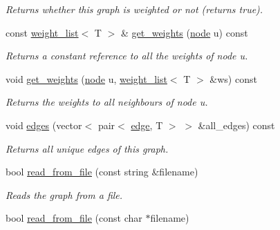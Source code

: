\begin{DoxyCompactItemize}
\begin{DoxyCompactList}\small\item\em Returns whether this graph is weighted or not (returns true). \end{DoxyCompactList}\item 
const \hyperlink{namespacelgraph_1_1utils_a11e7963f3637ea13778b8d3e69d2c17f}{weight\+\_\+list}$<$ T $>$ \& \hyperlink{classlgraph_1_1utils_1_1wxgraph_a06252e99191d39329947c3a5eef43e73}{get\+\_\+weights} (\hyperlink{namespacelgraph_1_1utils_a7bd66ede3805ef121bc2835bd48de0cf}{node} u) const 
\begin{DoxyCompactList}\small\item\em Returns a constant reference to all the weights of node {\itshape u}. \end{DoxyCompactList}\item 
void \hyperlink{classlgraph_1_1utils_1_1wxgraph_a23c629eb031e31681749da793f933548}{get\+\_\+weights} (\hyperlink{namespacelgraph_1_1utils_a7bd66ede3805ef121bc2835bd48de0cf}{node} u, \hyperlink{namespacelgraph_1_1utils_a11e7963f3637ea13778b8d3e69d2c17f}{weight\+\_\+list}$<$ T $>$ \&ws) const 
\begin{DoxyCompactList}\small\item\em Returns the weights to all neighbours of node {\itshape u}. \end{DoxyCompactList}\item 
void \hyperlink{classlgraph_1_1utils_1_1wxgraph_a73b6c8887d5088750ee2cc98c45089c6}{edges} (vector$<$ pair$<$ \hyperlink{namespacelgraph_1_1utils_a6510284ce1b1ae5dc97ce5d2de426e10}{edge}, T $>$ $>$ \&all\+\_\+edges) const 
\begin{DoxyCompactList}\small\item\em Returns all unique edges of this graph. \end{DoxyCompactList}\item 
bool \hyperlink{classlgraph_1_1utils_1_1wxgraph_a329e674f9e3543f3347343470d82d404}{read\+\_\+from\+\_\+file} (const string \&filename)\hypertarget{classlgraph_1_1utils_1_1wxgraph_a329e674f9e3543f3347343470d82d404}{}\label{classlgraph_1_1utils_1_1wxgraph_a329e674f9e3543f3347343470d82d404}

\begin{DoxyCompactList}\small\item\em Reads the graph from a file. \end{DoxyCompactList}\item 
bool \hyperlink{classlgraph_1_1utils_1_1wxgraph_a74bb3ab0064749a8062c33a9213a233f}{read\+\_\+from\+\_\+file} (const char $\ast$filename)\hypertarget{classlgraph_1_1utils_1_1wxgraph_a74bb3ab0064749a8062c33a9213a233f}{}\label{classlgraph_1_1utils_1_1wxgraph_a74bb3ab0064749a8062c33a9213a233f}


\end{DoxyCompactItemize}
